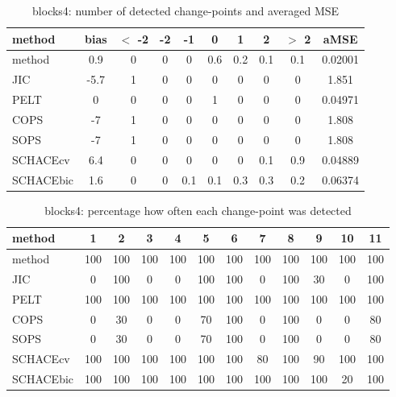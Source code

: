 \begin{table}[ht]
\centering
\begin{tabular}{l|c|ccccccc|c}
  \hline
method & bias & $<$ -2 & -2 & -1 & 0 & 1 & 2 & $>$ 2 & aMSE \\ 
  \hline
method &   0.9 &     0 &     0 &     0 &   0.6 &   0.2 &   0.1 &   0.1 & 0.02001 \\ 
  JIC &  -5.7 &     1 &     0 &     0 &     0 &     0 &     0 &     0 & 1.851 \\ 
  PELT &     0 &     0 &     0 &     0 &     1 &     0 &     0 &     0 & 0.04971 \\ 
  COPS &    -7 &     1 &     0 &     0 &     0 &     0 &     0 &     0 & 1.808 \\ 
  SOPS &    -7 &     1 &     0 &     0 &     0 &     0 &     0 &     0 & 1.808 \\ 
  SCHACEcv &   6.4 &     0 &     0 &     0 &     0 &     0 &   0.1 &   0.9 & 0.04889 \\ 
  SCHACEbic &   1.6 &     0 &     0 &   0.1 &   0.1 &   0.3 &   0.3 &   0.2 & 0.06374 \\ 
   \hline
\end{tabular}
\caption{blocks4: number of detected change-points and averaged MSE} 
\label{tab:blocks4Njumps}
\end{table}
\begin{table}[ht]
\centering
\begin{tabular}{l|ccccccccccc}
  \hline
method & 1 & 2 & 3 & 4 & 5 & 6 & 7 & 8 & 9 & 10 & 11 \\ 
  \hline
method &    100 &    100 &    100 &    100 &    100 &    100 &    100 &    100 &    100 &    100 &    100 \\ 
  JIC &      0 &    100 &      0 &      0 &    100 &    100 &      0 &    100 &     30 &      0 &    100 \\ 
  PELT &    100 &    100 &    100 &    100 &    100 &    100 &    100 &    100 &    100 &    100 &    100 \\ 
  COPS &      0 &     30 &      0 &      0 &     70 &    100 &      0 &    100 &      0 &      0 &     80 \\ 
  SOPS &      0 &     30 &      0 &      0 &     70 &    100 &      0 &    100 &      0 &      0 &     80 \\ 
  SCHACEcv &    100 &    100 &    100 &    100 &    100 &    100 &     80 &    100 &     90 &    100 &    100 \\ 
  SCHACEbic &    100 &    100 &    100 &    100 &    100 &    100 &    100 &    100 &    100 &     20 &    100 \\ 
   \hline
\end{tabular}
\caption{blocks4: percentage how often each change-point was detected} 
\label{tab:blocks4Detections}
\end{table}
